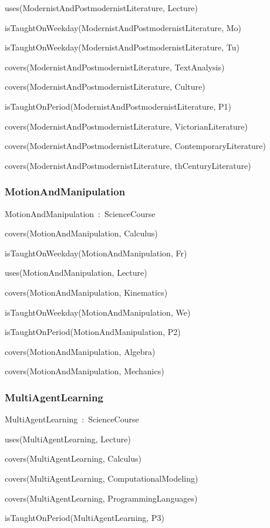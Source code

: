 \documentclass{article}
\begin{document}
uses(ModernistAndPostmodernistLiterature, Lecture)

isTaughtOnWeekday(ModernistAndPostmodernistLiterature, Mo)

isTaughtOnWeekday(ModernistAndPostmodernistLiterature, Tu)

covers(ModernistAndPostmodernistLiterature, TextAnalysis)

covers(ModernistAndPostmodernistLiterature, Culture)

isTaughtOnPeriod(ModernistAndPostmodernistLiterature, P1)

covers(ModernistAndPostmodernistLiterature, VictorianLiterature)

covers(ModernistAndPostmodernistLiterature, ContemporaryLiterature)

covers(ModernistAndPostmodernistLiterature, thCenturyLiterature)

\subsubsection*{MotionAndManipulation}

MotionAndManipulation~:~ScienceCourse

covers(MotionAndManipulation, Calculus)

isTaughtOnWeekday(MotionAndManipulation, Fr)

uses(MotionAndManipulation, Lecture)

covers(MotionAndManipulation, Kinematics)

isTaughtOnWeekday(MotionAndManipulation, We)

isTaughtOnPeriod(MotionAndManipulation, P2)

covers(MotionAndManipulation, Algebra)

covers(MotionAndManipulation, Mechanics)

\subsubsection*{MultiAgentLearning}

MultiAgentLearning~:~ScienceCourse

uses(MultiAgentLearning, Lecture)

covers(MultiAgentLearning, Calculus)

covers(MultiAgentLearning, ComputationalModeling)

covers(MultiAgentLearning, ProgrammingLanguages)

isTaughtOnPeriod(MultiAgentLearning, P3)
\end{document}

